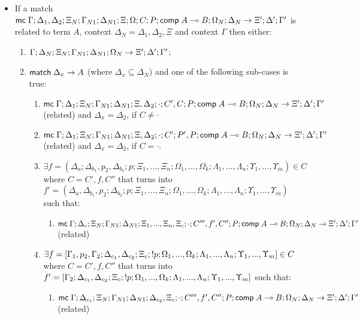 \begin{theorem}
   \begin{itemize}
      \item If a match $\mathsf{mc} \; \Gamma; \Delta_1, \Delta_2; \Xi_N; \Gamma_{N1}; \Delta_{N1}; \Xi; \Omega; C; P; \mathsf{comp} \; A \multimap B; \Omega_N; \Delta_N \rightarrow \Xi'; \Delta'; \Gamma'$ is related to term $A$, context $\Delta_N = \Delta_1, \Delta_2, \Xi$ and context $\Gamma$ then either:
      \begin{enumerate}
         \item $\do \Gamma; \Delta_N; \Xi_N; \Gamma_{N1}; \Delta_{N1}; \Omega_N \rightarrow \Xi'; \Delta'; \Gamma'$;
         \item $\mathsf{match} \; \Delta_x \rightarrow A$ (where $\Delta_x \subseteq \Delta_N$) and one of the following sub-cases is true:
         \begin{enumerate}
            \item $\mathsf{mc} \; \Gamma; \Delta_1; \Xi_N; \Gamma_{N1}; \Delta_{N1}; \Xi, \Delta_2; \cdot; C', C; P; \mathsf{comp} \; A \multimap B; \Omega_N; \Delta_N \rightarrow \Xi'; \Delta'; \Gamma'$ (related) and $\Delta_x = \Delta_2$, if $C \neq \cdot$
            \item $\mathsf{mc} \; \Gamma; \Delta_1; \Xi_N; \Gamma_{N1}; \Delta_{N1}; \Xi, \Delta_2; \cdot; C'; P', P; \mathsf{comp} \; A \multimap B; \Omega_N; \Delta_N \rightarrow \Xi'; \Delta'; \Gamma'$ (related) and $\Delta_x = \Delta_2$, if $C = \cdot$.
            \item $\exists f = (\Delta_a; \Delta_{b_1}, p_2, \Delta_{b_2}; p; \Xi_1, ..., \Xi_n; \Omega_1, ..., \Omega_k; \Lambda_1, ..., \Lambda_n; \Upsilon_1, ..., \Upsilon_m) \in C$ where $C = C', f, C''$ that turns into $f' = (\Delta_a, \Delta_{b_1}, p_2; \Delta_{b_2}; p; \Xi_1, ..., \Xi_n; \Omega_1, ..., \Omega_k; \Lambda_1, ..., \Lambda_n; \Upsilon_1, ..., \Upsilon_m)$ such that:
               \begin{enumerate}
                  \item $\mathsf{mc} \; \Gamma; \Delta_c; \Xi_N; \Gamma_{N1}; \Delta_{N1}; \Xi_1, ..., \Xi_n, \Xi_c; \cdot; C''', f', C''; P; \mathsf{comp} \; A \multimap B; \Omega_N; \Delta_N \rightarrow \Xi'; \Delta'; \Gamma'$ (related)
               \end{enumerate}
               
            \item $\exists f = [\Gamma_1, p_2, \Gamma_2; \Delta_{c_1}, \Delta_{c_2}; \Xi_c; {!} p; \Omega_1, ..., \Omega_k; \Lambda_1, ..., \Lambda_n; \Upsilon_1, ..., \Upsilon_m] \in C$ where $C = C', f, C''$ that turns into $f' = [\Gamma_2; \Delta_{c_1}, \Delta_{c_2}; \Xi_c; {!} p; \Omega_1, ..., \Omega_k; \Lambda_1, ..., \Lambda_n; \Upsilon_1, ..., \Upsilon_m]$ such that:
               \begin{enumerate}
                  \item $\mathsf{mc} \; \Gamma; \Delta_{c_1}; \Xi_N; \Gamma_{N1}; \Delta_{N1}; \Delta_{c_2}, \Xi_c; \cdot; C''', f', C''; P; \mathsf{comp} \; A \multimap B; \Omega_N; \Delta_N \rightarrow \Xi'; \Delta'; \Gamma'$ (related)
               \end{enumerate}
               

\end{enumerate}
\end{enumerate}
\end{itemize}
\end{theorem}
